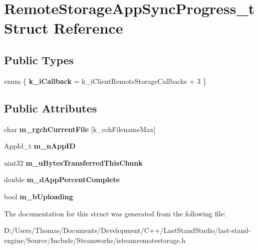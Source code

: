 \hypertarget{structRemoteStorageAppSyncProgress__t}{}\section{Remote\+Storage\+App\+Sync\+Progress\+\_\+t Struct Reference}
\label{structRemoteStorageAppSyncProgress__t}
\subsection*{Public Types}
\begin{DoxyCompactItemize}
\item 
\hypertarget{structRemoteStorageAppSyncProgress__t_a5bb194a07c59462074f3775d0d7e798f}{}enum \{ {\bfseries k\+\_\+i\+Callback} = k\+\_\+i\+Client\+Remote\+Storage\+Callbacks + 3
 \}\label{structRemoteStorageAppSyncProgress__t_a5bb194a07c59462074f3775d0d7e798f}

\end{DoxyCompactItemize}
\subsection*{Public Attributes}
\begin{DoxyCompactItemize}
\item 
\hypertarget{structRemoteStorageAppSyncProgress__t_aa14996fe7bb562707aed6e3334e21428}{}char {\bfseries m\+\_\+rgch\+Current\+File} \mbox{[}k\+\_\+cch\+Filename\+Max\mbox{]}\label{structRemoteStorageAppSyncProgress__t_aa14996fe7bb562707aed6e3334e21428}

\item 
\hypertarget{structRemoteStorageAppSyncProgress__t_a2655556742a52c21353e0585789decfe}{}App\+Id\+\_\+t {\bfseries m\+\_\+n\+App\+I\+D}\label{structRemoteStorageAppSyncProgress__t_a2655556742a52c21353e0585789decfe}

\item 
\hypertarget{structRemoteStorageAppSyncProgress__t_a07f1613bb15f5be10b302daed1a77573}{}uint32 {\bfseries m\+\_\+u\+Bytes\+Transferred\+This\+Chunk}\label{structRemoteStorageAppSyncProgress__t_a07f1613bb15f5be10b302daed1a77573}

\item 
\hypertarget{structRemoteStorageAppSyncProgress__t_a5405cb9788e5a82201dbf8a36462af82}{}double {\bfseries m\+\_\+d\+App\+Percent\+Complete}\label{structRemoteStorageAppSyncProgress__t_a5405cb9788e5a82201dbf8a36462af82}

\item 
\hypertarget{structRemoteStorageAppSyncProgress__t_a7db764d8ba8789531108c147ec7d1e58}{}bool {\bfseries m\+\_\+b\+Uploading}\label{structRemoteStorageAppSyncProgress__t_a7db764d8ba8789531108c147ec7d1e58}

\end{DoxyCompactItemize}


The documentation for this struct was generated from the following file\+:\begin{DoxyCompactItemize}
\item 
D\+:/\+Users/\+Thomas/\+Documents/\+Development/\+C++/\+Last\+Stand\+Studio/last-\/stand-\/engine/\+Source/\+Include/\+Steamworks/isteamremotestorage.\+h\end{DoxyCompactItemize}
